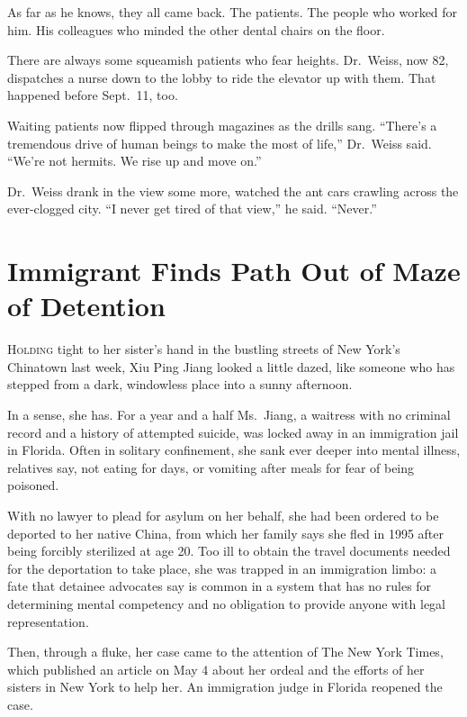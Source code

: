 ﻿\documentclass[12pt]{article}
\begin{document}
As far as he knows, they all came back. The patients. The people who worked for him. His colleagues
who minded the other dental chairs on the floor.

There are always some squeamish patients who fear heights. Dr.~Weiss, now 82, dispatches a nurse
down to the lobby to ride the elevator up with them. That happened before Sept.~11, too.

Waiting patients now flipped through magazines as the drills sang. ``There's a tremendous drive of
human beings to make the most of life,'' Dr.~Weiss said. ``We're not hermits. We rise up and move
on.''

Dr.~Weiss drank in the view some more, watched the ant cars crawling across the ever-clogged city.
``I never get tired of that view,'' he said. ``Never.''

\section{Immigrant Finds Path Out of Maze of Detention}

\lettrine{H}{olding} tight to her sister's hand in the bustling streets of New York's Chinatown last
week, Xiu Ping Jiang looked a little dazed, like someone who has stepped from a dark, windowless
place into a sunny afternoon.

In a sense, she has. For a year and a half Ms.~Jiang, a waitress with no criminal record and a
history of attempted suicide, was locked away in an immigration jail in Florida. Often in
solitary\cite{solitary} confinement\cite{confinement}, she sank ever deeper into mental illness,
relatives say, not eating for days, or vomiting after meals for fear of being poisoned.

With no lawyer to plead for asylum\cite{asylum} on her behalf, she had been ordered to be deported
to her native China, from which her family says she fled in 1995 after being forcibly sterilized at
age 20. Too ill to obtain the travel documents needed for the deportation to take place, she was
trapped in an immigration limbo: a fate that detainee advocates say is common in a system that has
no rules for determining mental competency and no obligation to provide anyone with legal
representation.

Then, through a fluke, her case came to the attention of The New York Times, which published an
article on May 4 about her ordeal\cite{ordeal} and the efforts of her sisters in New York to help
her. An immigration judge in Florida reopened the case.
\end{document}
